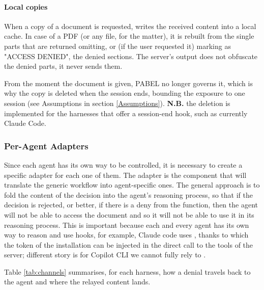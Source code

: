 \paragraph{Local copies}
When a copy of a document is requested,  writes the received content into a local cache. In case of a PDF (or any file, for the matter), it is rebuilt from the single parts that are returned omitting, or (if the user requested it) marking as "ACCESS DENIED", the denied sections.
The server's output does not obfuscate the denied parts, it never sends them.

From the moment the document is given, PABEL no longer governs it, which is why the copy is deleted when the session ends, bounding the exposure to one session (see Assumptions in section \ref{Assumptions}).
\textbf{N.B.} the deletion is implemented for the harnesses that offer a session-end hook, such as currently Claude Code.

\subsubsection{Per-Agent Adapters}
Since each agent has its own way to be controlled, it is necessary to create a specific adapter for each one of them. The adapter is the component that will translate the generic workflow into agent-specific ones.
The general approach is to fold the content of the decision into the agent's reasoning process, so that if the decision is rejected, or better, if there is a deny from the  function, then the agent will not be able to access the document and so it will not be able to use it in its reasoning process.
This is important because each and every agent has its own way to reason and use hooks, for example, Claude code uses , thanks to which the token of the installation can be injected in the direct call to the tools of the server; different story is for Copilot CLI we cannot fully rely to .

Table \ref{tab:channels} summarises, for each harness, how a denial travels back to the agent and where the relayed content lands.

